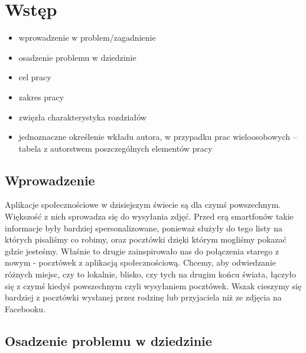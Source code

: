 \documentclass[a4paper,twoside,12pt]{book}
\newcounter{stronyPozaNumeracja}
\begin{document}
\tableofcontents

\setcounter{stronyPozaNumeracja}{\value{page}}
\mainmatter
\pagestyle{empty}

\cleardoublepage

\pagestyle{NumeryStronNazwyRozdzialow}


\chapter{Wstęp}
\label{ch:wstep}

\begin{itemize}
\item wprowadzenie w problem/zagadnienie
\item osadzenie problemu w dziedzinie
\item cel pracy
\item zakres pracy
\item zwięzła charakterystyka rozdziałów
\item jednoznaczne określenie wkładu autora, w przypadku prac wieloosobowych – tabela z autorstwem poszczególnych elementów pracy
\end{itemize}

\section{Wprowadzenie}
Aplikacje społecznościowe w dzisiejszym świecie są dla czymś powszechnym. Większość z nich sprowadza się do wysyłania zdjęć. Przed erą smartfonów takie informacje były bardziej spersonalizowane, ponieważ służyły do tego listy na których pisaliśmy co robimy, oraz pocztówki dzięki którym mogliśmy pokazać gdzie jesteśmy. Właśnie to drugie zainspirowało nas do połączenia starego z nowym - pocztówek z aplikacją społecznościową. Chcemy, aby odwiedzanie różnych miejsc, czy to lokalnie, blisko, czy tych na drugim końcu świata, łączyło się z czymś kiedyś powszechnym czyli wysyłaniem pocztówek. Wszak cieszymy się bardziej z pocztówki wysłanej przez rodzinę lub przyjaciela niż ze zdjęcia na Facebooku.

\section{Osadzenie problemu w dziedzinie}
\end{document}
